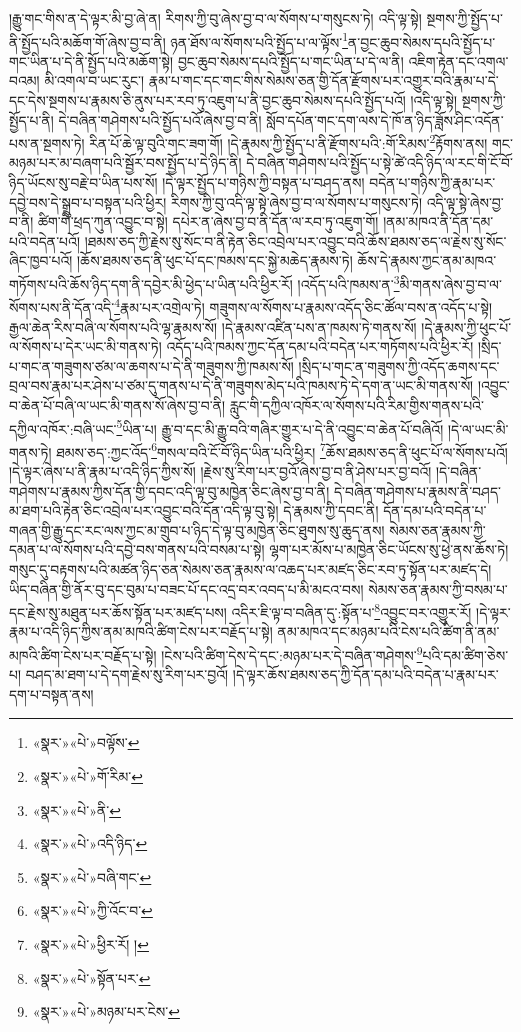 །རྒྱུ་གང་གིས་ན་དེ་ལྟར་མི་བྱ་ཞེ་ན། རིགས་ཀྱི་བུ་ཞེས་བྱ་བ་ལ་སོགས་པ་གསུངས་ཏེ། འདི་ལྟ་སྟེ། སྔགས་ཀྱི་སྤྱོད་པ་ནི་སྤྱོད་པའི་མཆོག་གོ་ཞེས་བྱ་བ་ནི། ཉན་ཐོས་ལ་སོགས་པའི་སྤྱོད་པ་ལ་ལྟོས་\footnote{«སྣར་»«པེ་»བལྟོས་}ན་བྱང་ཆུབ་སེམས་དཔའི་སྤྱོད་པ་གང་ཡིན་པ་དེ་ནི་སྤྱོད་པའི་མཆོག་སྟེ། བྱང་ཆུབ་སེམས་དཔའི་སྤྱོད་པ་གང་ཡིན་པ་དེ་ལ་ནི། འཇིག་རྟེན་དང་འགལ་བའམ། མི་འགལ་བ་ཡང་རུང་། རྣམ་པ་གང་དང་གང་གིས་སེམས་ཅན་གྱི་དོན་རྫོགས་པར་འགྱུར་བའི་རྣམ་པ་དེ་དང་དེས་སྔགས་པ་རྣམས་ཅི་ནུས་པར་རབ་ཏུ་འཇུག་པ་ནི་བྱང་ཆུབ་སེམས་དཔའི་སྤྱོད་པའོ། །འདི་ལྟ་སྟེ། སྔགས་ཀྱི་སྤྱོད་པ་ནི། དེ་བཞིན་གཤེགས་པའི་སྤྱོད་པའོ་ཞེས་བྱ་བ་ནི། སློབ་དཔོན་གང་དག་ལས་དེ་ཁོ་ན་ཉིད་ཟློས་ཤིང་འདོན་པས་ན་སྔགས་ཏེ། རིན་པོ་ཆེ་ལྟ་བུའི་གང་ཟག་གོ། །དེ་རྣམས་ཀྱི་སྤྱོད་པ་ནི་རྫོགས་པའི་:གོ་རིམས་\footnote{«སྣར་»«པེ་»གོ་རིམ་}རྟོགས་ནས། གང་མཉམ་པར་མ་བཞག་པའི་སྦྱོར་བས་སྤྱོད་པ་དེ་ཉིད་ནི། དེ་བཞིན་གཤེགས་པའི་སྤྱོད་པ་སྟེ་ཚེ་འདི་ཉིད་ལ་རང་གི་ངོ་བོ་ཉིད་ཡོངས་སུ་བརྗེ་བ་ཡིན་པས་སོ། །དེ་ལྟར་སྤྱོད་པ་གཉིས་ཀྱི་བསྟན་པ་བཤད་ནས། བདེན་པ་གཉིས་ཀྱི་རྣམ་པར་དབྱེ་བས་དེ་སྒྲུབ་པ་བསྟན་པའི་ཕྱིར། རིགས་ཀྱི་བུ་འདི་ལྟ་སྟེ་ཞེས་བྱ་བ་ལ་སོགས་པ་གསུངས་ཏེ། འདི་ལྟ་སྟེ་ཞེས་བྱ་བ་ནི། ཚིག་གི་ཕྲད་ཀུན་འབྱུང་བ་སྟེ། དཔེར་ན་ཞེས་བྱ་བ་ནི་དོན་ལ་རབ་ཏུ་འཇུག་གོ། །ནམ་མཁའ་ནི་དོན་དམ་པའི་བདེན་པའོ། །ཐམས་ཅད་ཀྱི་རྗེས་སུ་སོང་བ་ནི་རྟེན་ཅིང་འབྲེལ་པར་འབྱུང་བའི་ཆོས་ཐམས་ཅད་ལ་རྗེས་སུ་སོང་ཞིང་ཁྱབ་པའོ། །ཆོས་ཐམས་ཅད་ནི་ཕུང་པོ་དང་ཁམས་དང་སྐྱེ་མཆེད་རྣམས་ཏེ། ཆོས་དེ་རྣམས་ཀྱང་ནམ་མཁའ་གཏོགས་པའི་ཆོས་ཉིད་དག་ནི་དབྱེར་མི་ཕྱེད་པ་ཡིན་པའི་ཕྱིར་རོ། །འདོད་པའི་ཁམས་ན་\footnote{«སྣར་»«པེ་»ནི་}མི་གནས་ཞེས་བྱ་བ་ལ་སོགས་པས་ནི་དོན་འདི་\footnote{«སྣར་»«པེ་»འདི་ཉིད་}རྣམ་པར་འགྲེལ་ཏེ། གཟུགས་ལ་སོགས་པ་རྣམས་འདོད་ཅིང་ཚོལ་བས་ན་འདོད་པ་སྟེ། རྒྱལ་ཆེན་རིས་བཞི་ལ་སོགས་པའི་ལྷ་རྣམས་སོ། །དེ་རྣམས་འཛིན་པས་ན་ཁམས་ཏེ་གནས་སོ། །དེ་རྣམས་ཀྱི་ཕུང་པོ་ལ་སོགས་པ་དེར་ཡང་མི་གནས་ཏེ། འདོད་པའི་ཁམས་ཀྱང་དོན་དམ་པའི་བདེན་པར་གཏོགས་པའི་ཕྱིར་རོ། །སྲིད་པ་གང་ན་གཟུགས་ཙམ་ལ་ཆགས་པ་དེ་ནི་གཟུགས་ཀྱི་ཁམས་སོ། །སྲིད་པ་གང་ན་གཟུགས་ཀྱི་འདོད་ཆགས་དང་བྲལ་བས་རྣམ་པར་ཤེས་པ་ཙམ་དུ་གནས་པ་དེ་ནི་གཟུགས་མེད་པའི་ཁམས་ཏེ་དེ་དག་ན་ཡང་མི་གནས་སོ། །འབྱུང་བ་ཆེན་པོ་བཞི་ལ་ཡང་མི་གནས་སོ་ཞེས་བྱ་བ་ནི། རླུང་གི་དཀྱིལ་འཁོར་ལ་སོགས་པའི་རིམ་གྱིས་གནས་པའི་དཀྱིལ་འཁོར་:བཞི་ཡང་\footnote{«སྣར་»«པེ་»བཞི་གང་}ཡིན་པ། རྒྱུ་བ་དང་མི་རྒྱུ་བའི་གཞིར་གྱུར་པ་དེ་ནི་འབྱུང་བ་ཆེན་པོ་བཞིའོ། །དེ་ལ་ཡང་མི་གནས་ཏེ། ཐམས་ཅད་:ཀྱང་འོད་\footnote{«སྣར་»«པེ་»ཀྱི་འོང་བ་}གསལ་བའི་ངོ་བོ་ཉིད་ཡིན་པའི་ཕྱིར། \footnote{«སྣར་»«པེ་»ཕྱིར་རོ། ། }ཆོས་ཐམས་ཅད་ནི་ཕུང་པོ་ལ་སོགས་པའོ། །དེ་ལྟར་ཞེས་པ་ནི་རྣམ་པ་འདི་ཉིད་ཀྱིས་སོ། །རྗེས་སུ་རིག་པར་བྱའོ་ཞེས་བྱ་བ་ནི་ཤེས་པར་བྱ་བའོ། །དེ་བཞིན་གཤེགས་པ་རྣམས་ཀྱིས་དོན་གྱི་དབང་འདི་ལྟ་བུ་མཁྱེན་ཅིང་ཞེས་བྱ་བ་ནི། དེ་བཞིན་གཤེགས་པ་རྣམས་ནི་བཤད་མ་ཐག་པའི་རྟེན་ཅིང་འབྲེལ་པར་འབྱུང་བའི་དོན་འདི་ལྟ་བུ་སྟེ། དེ་རྣམས་ཀྱི་དབང་ནི། དོན་དམ་པའི་བདེན་པ་གཞན་གྱི་རྒྱུ་དང་རང་ལས་ཀྱང་མ་གྲུབ་པ་ཉིད་དེ་ལྟ་བུ་མཁྱེན་ཅིང་ཐུགས་སུ་ཆུད་ནས། སེམས་ཅན་རྣམས་ཀྱི་དམན་པ་ལ་སོགས་པའི་དབྱེ་བས་གནས་པའི་བསམ་པ་སྟེ། ལྷག་པར་མོས་པ་མཁྱེན་ཅིང་ཡོངས་སུ་ཕྱེ་ནས་ཆོས་ཏེ། གསུང་དུ་བརྟགས་པའི་མཚན་ཉིད་ཅན་སེམས་ཅན་རྣམས་ལ་འཆད་པར་མཛད་ཅིང་རབ་ཏུ་སྟོན་པར་མཛད་དེ། ཡིད་བཞིན་གྱི་ནོར་བུ་དང་བུམ་པ་བཟང་པོ་དང་འདྲ་བར་འབད་པ་མི་མངའ་བས། སེམས་ཅན་རྣམས་ཀྱི་བསམ་པ་དང་རྗེས་སུ་མཐུན་པར་ཆོས་སྟོན་པར་མཛད་པས། འདིར་ཇི་ལྟ་བ་བཞིན་དུ་:སྟོན་པ་\footnote{«སྣར་»«པེ་»སྟོན་པར་}འབྱུང་བར་འགྱུར་རོ། །དེ་ལྟར་རྣམ་པ་འདི་ཉིད་ཀྱིས་ནམ་མཁའི་ཚིག་ངེས་པར་བརྗོད་པ་སྟེ། ནམ་མཁའ་དང་མཉམ་པའི་ངེས་པའི་ཚིག་ནི་ནམ་མཁའི་ཚིག་ངེས་པར་བརྗོད་པ་སྟེ། །ངེས་པའི་ཚིག་དེས་དེ་དང་:མཉམ་པར་དེ་བཞིན་གཤེགས་\footnote{«སྣར་»«པེ་»མཉམ་པར་ངེས་}པའི་དམ་ཚིག་ཅེས་པ། བཤད་མ་ཐག་པ་དེ་དག་རྗེས་སུ་རིག་པར་བྱའོ། །དེ་ལྟར་ཆོས་ཐམས་ཅད་ཀྱི་དོན་དམ་པའི་བདེན་པ་རྣམ་པར་དག་པ་བསྟན་ནས། 